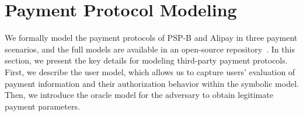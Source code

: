 \section{Payment Protocol Modeling} \label{sec:modeling}
We formally model the payment protocols of PSP-B and Alipay in three payment scenarios, and the full models are available in an open-source repository~\cite{third_payment_model_2026}.
In this section, we present the key details for modeling third-party payment protocols.
First, we describe the user model, which allows us to capture users' evaluation of payment information and their authorization behavior within the symbolic model.
Then, we introduce the oracle model for the adversary to obtain legitimate payment parameters.


